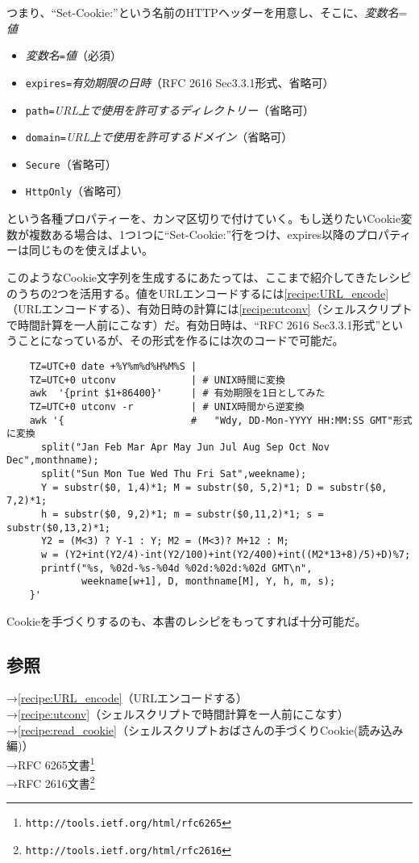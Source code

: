 つまり、``Set-Cookie:''という名前のHTTPヘッダーを用意し、そこに、\textit{変数名}=\textit{値}
\begin{itemize}
  \item \textit{変数名}\verb|=|\textit{値}（必須）
  \item \verb|expires=|\textit{有効期限の日時}（RFC 2616 Sec3.3.1形式、省略可）
  \item \verb|path=|\textit{URL上で使用を許可するディレクトリー}（省略可）
  \item \verb|domain=|\textit{URL上で使用を許可するドメイン}（省略可）
  \item \verb|Secure|（省略可）
  \item \verb|HttpOnly|（省略可）
\end{itemize}
という各種プロパティーを、カンマ区切りで付けていく。もし送りたいCookie変数が複数ある場合は、1つ1つに``Set-Cookie:''行をつけ、expires以降のプロパティーは同じものを使えばよい。

このようなCookie文字列を生成するにあたっては、ここまで紹介してきたレシピのうちの2つを活用する。値をURLエンコードするには\ref{recipe:URL_encode}（URLエンコードする）、有効日時の計算には\ref{recipe:utconv}（シェルスクリプトで時間計算を一人前にこなす）だ。有効日時は、``RFC 2616 Sec3.3.1形式''ということになっているが、その形式を作るには次のコードで可能だ。\\
\begin{frameboxit}{160.0mm}
\begin{verbatim}
	TZ=UTC+0 date +%Y%m%d%H%M%S |
	TZ=UTC+0 utconv             | # UNIX時間に変換
	awk  '{print $1+86400}'     | # 有効期限を1日としてみた
	TZ=UTC+0 utconv -r          | # UNIX時間から逆変換
	awk '{                      #   "Wdy, DD-Mon-YYYY HH:MM:SS GMT"形式に変換
	  split("Jan Feb Mar Apr May Jun Jul Aug Sep Oct Nov Dec",monthname);
	  split("Sun Mon Tue Wed Thu Fri Sat",weekname);
	  Y = substr($0, 1,4)*1; M = substr($0, 5,2)*1; D = substr($0, 7,2)*1;
	  h = substr($0, 9,2)*1; m = substr($0,11,2)*1; s = substr($0,13,2)*1;
	  Y2 = (M<3) ? Y-1 : Y; M2 = (M<3)? M+12 : M;
	  w = (Y2+int(Y2/4)-int(Y2/100)+int(Y2/400)+int((M2*13+8)/5)+D)%7;
	  printf("%s, %02d-%s-%04d %02d:%02d:%02d GMT\n",
	         weekname[w+1], D, monthname[M], Y, h, m, s);
	}'
\end{verbatim}
\end{frameboxit}

Cookieを手づくりするのも、本書のレシピをもってすれば十分可能だ。


\subsection*{参照}

\noindent
→\ref{recipe:URL_encode}（URLエンコードする） \\
→\ref{recipe:utconv}（シェルスクリプトで時間計算を一人前にこなす） \\
→\ref{recipe:read_cookie}（シェルスクリプトおばさんの手づくりCookie(読み込み編)） \\
→RFC 6265文書\footnote{\verb|http://tools.ietf.org/html/rfc6265|} \\
→RFC 2616文書\footnote{\verb|http://tools.ietf.org/html/rfc2616|}
